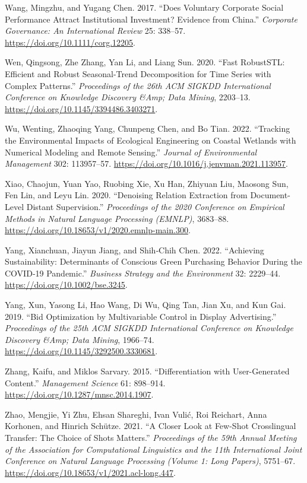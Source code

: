 \documentclass[
  12pt,
]{article}
\newlength{\cslhangindent}
\newenvironment{CSLReferences}[2] %
 {\begin{list}{}{%
  \setlength{\itemindent}{0pt}
  \setlength{\leftmargin}{0pt}
  \setlength{\parsep}{0pt}
  \ifodd #1
   \setlength{\leftmargin}{\cslhangindent}
   \setlength{\itemindent}{-1\cslhangindent}
  \fi
  \setlength{\itemsep}{#2\baselineskip}}}
 {\end{list}}
\begin{document}
\begin{CSLReferences}{1}{0}
Wang, Mingzhu, and Yugang Chen. 2017. {``Does Voluntary Corporate Social
Performance Attract Institutional Investment? Evidence from China.''}
\emph{Corporate Governance: An International Review} 25: 338--57.
\url{https://doi.org/10.1111/corg.12205}.

Wen, Qingsong, Zhe Zhang, Yan Li, and Liang Sun. 2020. {``Fast
RobustSTL: Efficient and Robust Seasonal-Trend Decomposition for Time
Series with Complex Patterns.''} \emph{Proceedings of the 26th ACM
SIGKDD International Conference on Knowledge Discovery \&Amp; Data
Mining}, 2203--13. \url{https://doi.org/10.1145/3394486.3403271}.

Wu, Wenting, Zhaoqing Yang, Chunpeng Chen, and Bo Tian. 2022.
{``Tracking the Environmental Impacts of Ecological Engineering on
Coastal Wetlands with Numerical Modeling and Remote Sensing.''}
\emph{Journal of Environmental Management} 302: 113957--57.
\url{https://doi.org/10.1016/j.jenvman.2021.113957}.

Xiao, Chaojun, Yuan Yao, Ruobing Xie, Xu Han, Zhiyuan Liu, Maosong Sun,
Fen Lin, and Leyu Lin. 2020. {``Denoising Relation Extraction from
Document-Level Distant Supervision.''} \emph{Proceedings of the 2020
Conference on Empirical Methods in Natural Language Processing (EMNLP)},
3683--88. \url{https://doi.org/10.18653/v1/2020.emnlp-main.300}.

Yang, Xianchuan, Jiayun Jiang, and Shih‐Chih Chen. 2022. {``Achieving
Sustainability: Determinants of Conscious Green Purchasing Behavior
During the COVID‐19 Pandemic.''} \emph{Business Strategy and the
Environment} 32: 2229--44. \url{https://doi.org/10.1002/bse.3245}.

Yang, Xun, Yasong Li, Hao Wang, Di Wu, Qing Tan, Jian Xu, and Kun Gai.
2019. {``Bid Optimization by Multivariable Control in Display
Advertising.''} \emph{Proceedings of the 25th ACM SIGKDD International
Conference on Knowledge Discovery \&Amp; Data Mining}, 1966--74.
\url{https://doi.org/10.1145/3292500.3330681}.

Zhang, Kaifu, and Miklos Sarvary. 2015. {``Differentiation with
User-Generated Content.''} \emph{Management Science} 61: 898--914.
\url{https://doi.org/10.1287/mnsc.2014.1907}.

Zhao, Mengjie, Yi Zhu, Ehsan Shareghi, Ivan Vulić, Roi Reichart, Anna
Korhonen, and Hinrich Schütze. 2021. {``A Closer Look at Few-Shot
Crosslingual Transfer: The Choice of Shots Matters.''} \emph{Proceedings
of the 59th Annual Meeting of the Association for Computational
Linguistics and the 11th International Joint Conference on Natural
Language Processing (Volume 1: Long Papers)}, 5751--67.
\url{https://doi.org/10.18653/v1/2021.acl-long.447}.

\end{CSLReferences}
\end{document}
